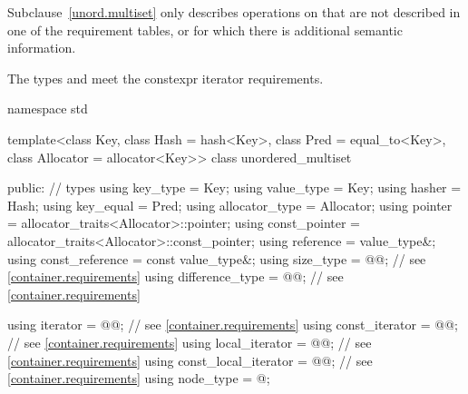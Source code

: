 \pnum
Subclause~\ref{unord.multiset} only describes operations on  that
are not described in one of the requirement tables, or for which there
is additional semantic information.

\pnum
The types  and  meet
the constexpr iterator requirements.

%
\begin{codeblock}
namespace std {
  template<class Key,
           class Hash = hash<Key>,
           class Pred = equal_to<Key>,
           class Allocator = allocator<Key>>
  class unordered_multiset {
  public:
    // types
    using key_type             = Key;
    using value_type           = Key;
    using hasher               = Hash;
    using key_equal            = Pred;
    using allocator_type       = Allocator;
    using pointer              = allocator_traits<Allocator>::pointer;
    using const_pointer        = allocator_traits<Allocator>::const_pointer;
    using reference            = value_type&;
    using const_reference      = const value_type&;
    using size_type            = @@; // see \ref{container.requirements}
    using difference_type      = @@; // see \ref{container.requirements}

    using iterator             = @@; // see \ref{container.requirements}
    using const_iterator       = @@; // see \ref{container.requirements}
    using local_iterator       = @@; // see \ref{container.requirements}
    using const_local_iterator = @@; // see \ref{container.requirements}
    using node_type            = @\unspec@;

}}
\end{codeblock}
